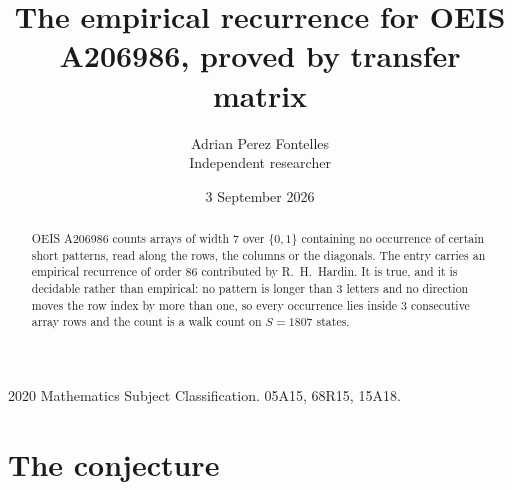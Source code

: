 \documentclass[11pt,a4paper]{article}
\title{The empirical recurrence for OEIS A206986, proved by transfer matrix}
\author{Adrian Perez Fontelles\\ \small Independent researcher}
\date{3 September 2026}
\theoremstyle{plain}
\theoremstyle{definition}
\begin{document}
\maketitle

\begin{abstract}
OEIS A206986 counts arrays of width $7$ over $\{0,1\}$ containing no occurrence of certain short
patterns, read along the rows, the columns or the diagonals. The entry carries an empirical
recurrence of order $86$ contributed by R.~H.~Hardin. It is true, and it is decidable
rather than empirical: no pattern is longer than $3$ letters and no direction moves the row
index by more than one, so every occurrence lies inside $3$ consecutive array rows and the
count is a walk count on $S=1807$ states.
\end{abstract}

\noindent\small 2020 Mathematics Subject Classification. 05A15, 68R15, 15A18.\normalsize

\section{The conjecture}
\end{document}
